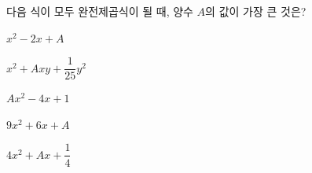 다음 식이 모두 완전제곱식이 될 때, 양수 $A$의 값이 가장 큰 것은?
\begin{choicesii}{\rule[-3ex]{0pt}{8ex}$x^2-2x+A$}{\rule[-3ex]{0pt}{8ex}$x^2+Axy+\dfrac{1}{25}y^2$}{\rule[-3ex]{0pt}{8ex}$Ax^2-4x+1$}{\rule[-3ex]{0pt}{8ex}$9x^2+6x+A$}{\rule[-3ex]{0pt}{8ex}$4x^2+Ax+\dfrac{1}{4}$}\end{choicesii}
